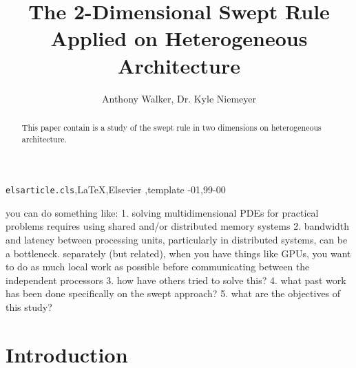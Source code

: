 \documentclass[review]{elsarticle}
\begin{document}
\begin{frontmatter}

\title{The 2-Dimensional Swept Rule Applied on Heterogeneous Architecture}

\author{Anthony Walker, Dr. Kyle Niemeyer}


%



\begin{abstract}
This paper contain is a study of the swept rule in two dimensions on heterogeneous
architecture.
\end{abstract}

\begin{keyword}
\texttt{elsarticle.cls}\sep \LaTeX\sep Elsevier \sep template
-01\sep  99-00
\end{keyword}

\end{frontmatter}

\linenumbers

you can do something like:
1. solving multidimensional PDEs for practical problems requires using shared and/or distributed memory systems
2.  bandwidth and latency between processing units, particularly in distributed systems, can be a bottleneck. separately (but related), when you have things like GPUs, you want to do as much local work as possible before communicating between the independent processors
3. how have others tried to solve this?
4. what past work has been done specifically on the swept approach?
5. what are the objectives of this study?

\section{Introduction}
\end{document}
